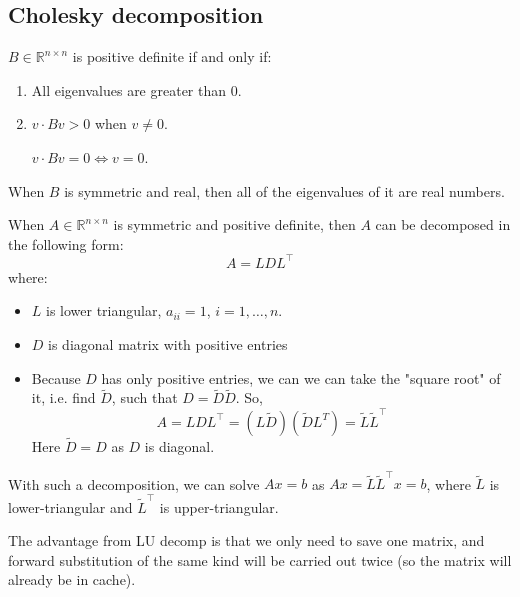 \pagebreak
\subsection{Cholesky decomposition}

\begin{definition}
    $B \in \mathbb{R}^{n \times n}$ is positive definite if and only if:
    \begin{enumerate}
        \item {
            All eigenvalues are greater than 0.
        }
        \item {
            $v \cdot Bv > 0$ when $v \ne 0$.

            $v \cdot Bv = 0 \Longleftrightarrow v = 0$.
        }
    \end{enumerate}
\end{definition}

\begin{statement}
    When $B$ is symmetric and real, then all of the eigenvalues of it are real numbers.
\end{statement}

\begin{definition}
    When $A \in \mathbb{R}^{n \times n}$ is symmetric and positive definite,
    then $A$ can be decomposed in the following form:
    \[ A = LDL^\intercal \]
    where:
    \begin{itemize}
        \item {
            $L$ is lower triangular, $a_{ii} = 1$, $i = 1, \dots, n$.
        }
        \item {
            $D$ is diagonal matrix with positive entries
        }
        \item {
            Because $D$ has only positive entries, we can we can 
            take the "square root" of it, i.e. find $\tilde{D}$, such that
            $D = \tilde{D} \tilde{D}$.
            So,
            \[ A = L D L^\intercal = (L\tilde{D}) (\tilde{D} L^T) = \tilde{L} \tilde{L}^\intercal \]
            Here $\tilde{D} = D$ as $D$ is diagonal.
        }
    \end{itemize}
\end{definition}

With such a decomposition, we can solve $Ax = b$ as
$Ax = \tilde{L} \tilde{L}^\intercal x = b$, where
$\tilde{L}$ is lower-triangular and $\tilde{L}^\intercal$ is upper-triangular.

The advantage from LU decomp is that we only need to save one matrix,
and forward substitution of the same kind will be carried out twice (so the matrix
will already be in cache).

